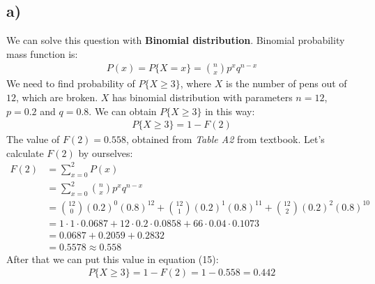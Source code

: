 \documentclass[12pt]{article}
\begin{document}
\subsection*{a)}
We can solve this question with \textbf{Binomial distribution}.
Binomial probability mass function is:
\begin{equation}
    \begin{split}
        P(x) = P\{X = x\} = \binom{n}{x} p^x q^{n-x}
    \end{split}
\end{equation}
We need to find probability of $P\{X \geq 3\}$, where $X$ is the number of pens out of $12$, which are broken. $X$ has binomial distribution with parameters $n = 12$, $p = 0.2$ and $q = 0.8$. We can obtain $P\{X \geq 3\}$ in this way:
\begin{equation}
    \begin{split}
        P\{X \geq 3\} = 1 - F(2)
    \end{split}
\end{equation}
The value of $F(2) = 0.558$, obtained from \textit{Table A2} from textbook. Let's calculate $F(2)$ by ourselves:
\begin{equation}
    \begin{split}
        F(2) &= \sum_{x = 0}^{2} P(x) \\
        &= \sum_{x = 0}^{2} \binom{n}{x} p^x q^{n-x}\\
        &= \binom{12}{0} (0.2)^{0} (0.8)^{12} + \binom{12}{1} (0.2)^{1} (0.8)^{11} + \binom{12}{2} (0.2)^{2} (0.8)^{10}\\
        &= 1 \cdot 1 \cdot 0.0687 + 12\cdot 0.2 \cdot 0.0858 + 66 \cdot 0.04 \cdot 0.1073 \\
        &= 0.0687 + 0.2059 + 0.2832 \\
        &= 0.5578 \approx 0.558
    \end{split}
\end{equation}
After that we can put this value in equation (15):
\begin{equation}
    \begin{split}
         P\{X \geq 3\} = 1 - F(2) = 1 - 0.558 = 0.442
    \end{split}
\end{equation}
\end{document}
